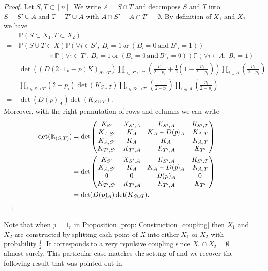 \documentclass{article}
\numberwithin{equation}{section}
\newcommand{\bK}{\mathbb{K}}
\theoremstyle{plain}
\begin{document}
\begin{proof}
Let $S,T\subset [n]$. We write $A=S\cap T$ and decompose $S$ and $T$ into $S=S'\cup A$ and $T=T'\cup A$ with $A\cap S'=A\cap T'=\emptyset$. By definition of $X_1$ and $X_2$ we have
\begin{align*}
&\mathbb{P}(S\subset X_1, T\subset X_2)\\
=~&\mathbb{P}(S\cup T\subset X)\mathbb{P}(\forall i\in S',~B_i=1~\mbox{or}~(B_i=0~\mbox{and}~B'_i=1))\\
&~~~~~~~~~~~~~~~~~~~\times\mathbb{P}(\forall i\in T',~B_i=1~\mbox{or}~(B_i=0~\mbox{and}~B'_i=0))\mathbb{P}(\forall i\in A,~B_i=1)\\
=~&\det((D(2\cdot 1_n-p)K)_{S\cup T})\prod_{i\in S'\cup T'}\left(\frac{p_i}{2-p_i}+\frac{1}{2}\left(1-\frac{p_i}{2-p_i}\right)\right)\prod_{i\in A}\left(\frac{p_i}{2-p_i}\right)\\
=~&\prod_{i\in S\cup T}(2-p_i)\det(K_{S\cup T})\prod_{i\in S'\cup T'}\left(\frac{1}{2-p_i}\right)\prod_{i\in A}\left(\frac{p_i}{2-p_i}\right)\\
=~&\det(D(p)_A)\det(K_{S\cup T}).
\end{align*}
Moreover, with the right permutation of rows and columns we can write
\begin{align*}
\det(\bK_{(S, T)})&=\det\begin{pmatrix}
K_{S'} & K_{S', A} & K_{S', A} & K_{S', T} \\
K_{A, S'} & K_{A} & K_{A} - D(p)_A & K_{A, T} \\
K_{A, S'} & K_{A} & K_{A} & K_{A, T} \\
K_{T', S'} & K_{T', A} & K_{T', A} & K_{T'} \\
\end{pmatrix}\\
&=\det\begin{pmatrix}
K_{S'} & K_{S', A} & K_{S', A} & K_{S', T} \\
K_{A, S'} & K_{A} & K_{A} - D(p)_A & K_{A, T} \\
0 & 0 & D(p)_A & 0 \\
K_{T', S'} & K_{T', A} & K_{T', A} & K_{T'} \\
\end{pmatrix}\\
&=\det(D(p)_A)\det(K_{S\cup T}).\qedhere
\end{align*}
\end{proof}

\noindent Note that when $p=1_n$ in Proposition \ref{prop: Construction_coupling} then $X_1$ and $X_2$ are constructed by splitting each point of $X$ into either $X_1$ or $X_2$ with probability $\frac 1 2$. It corresponds to a very repulsive coupling since $X_1\cap X_2=\emptyset$ almost surely. This particular case matches the setting of \cite{Affandi} and we recover the following result that was pointed out in \cite{Gourieroux}:
\end{document}
